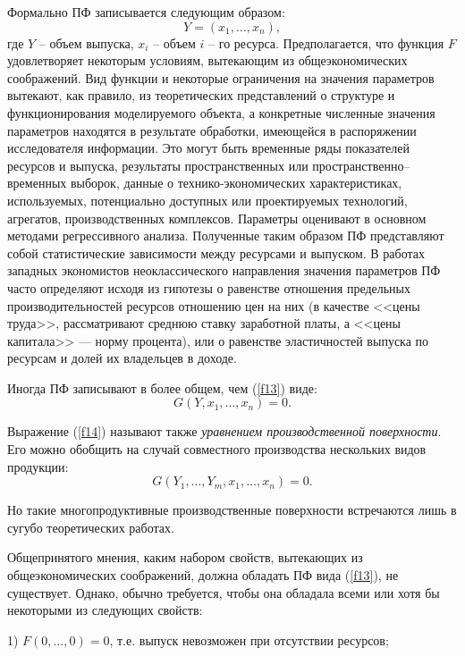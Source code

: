 \documentclass[12pt,openbib]{report}
\begin{document}
Формально ПФ записывается следующим образом:
\begin{equation}\label{f13}
Y=(x_1,\dots,x_n),
\end{equation}
где $Y$ -- объем выпуска, $x_i$ -- объем $i$ -- го ресурса.
Предполагается, что функция $F$ удовлетворяет некоторым условиям,
вытекающим из общеэкономических соображений. Вид функции и некоторые
ограничения на значения параметров вытекают, как правило, из
теоретических представлений о структуре и функционирования
моделируемого объекта, а конкретные численные значения параметров
находятся в результате обработки, имеющейся в распоряжении
исследователя информации. Это могут быть временные ряды показателей
ресурсов и выпуска, результаты пространственных или
пространственно--временных выборок, данные о технико-экономических
характеристиках, используемых, потенциально доступных или
проектируемых технологий, агрегатов, производственных комплексов.
Параметры оценивают в основном методами регрессивного анализа.
Полученные таким образом ПФ представляют собой статистические
зависимости между ресурсами и выпуском. В работах западных
экономистов неоклассического направления значения параметров ПФ
часто определяют исходя из гипотезы о равенстве отношения предельных
производительностей ресурсов отношению цен на них (в качестве <<цены
труда>>, рассматривают среднюю ставку заработной платы, а <<цены
капитала>> --- норму процента), или о равенстве эластичностей
выпуска по ресурсам и долей их владельцев в доходе.

Иногда ПФ записывают в более общем, чем (\ref{f13}) виде:
\begin{equation}\label{f14}
G(Y,x_1,\dots,x_n)=0.
\end{equation}

Выражение (\ref{f14}) называют также {\it уравнением производственной
поверхности}. Его можно обобщить на случай совместного производства
нескольких видов продукции:
\begin{equation}\label{f15}
G(Y_1,\dots,Y_m,x_1,\dots,x_n)=0.
\end{equation}

Но такие многопродуктивные производственные поверхности встречаются
лишь в сугубо теоретических работах.

Общепринятого мнения, каким набором свойств, вытекающих из
общеэкономических соображений, должна обладать ПФ вида (\ref{f13}), не
существует. Однако, обычно требуется, чтобы она обладала всеми или
хотя бы некоторыми из следующих свойств:

1) $F(0,\dots,0)=0$, т.е. выпуск невозможен при отсутствии ресурсов;
\end{document}
